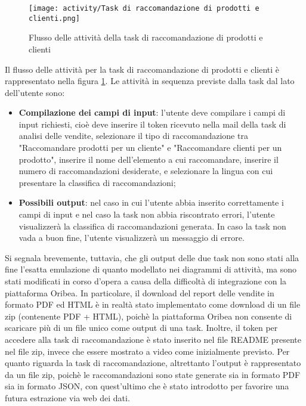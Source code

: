 \begin{figure}[!h]
    \centering 
    \texttt{[image: activity/Task di raccomandazione di prodotti e clienti.png]}
    \caption{Flusso delle attività della task di raccomandazione di prodotti e clienti}
    \label{fig:activity-recommendation-products-customers}
\end{figure}

Il flusso delle attività per la task di raccomandazione di prodotti e clienti è rappresentato nella figura \ref{fig:activity-recommendation-products-customers}. Le attività in sequenza previste dalla task dal lato dell'utente sono:
\begin{itemize}
    \item \textbf{Compilazione dei campi di input}: l'utente deve compilare i campi di input richiesti, cioè deve inserire il token ricevuto nella mail della task di analisi delle vendite, selezionare il tipo di raccomandazione tra "Raccomandare prodotti per un cliente" e "Raccomandare clienti per un prodotto", inserire il nome dell'elemento a cui raccomandare, inserire il numero di raccomandazioni desiderate, e selezionare la lingua con cui presentare la classifica di raccomandazioni;
    \item \textbf{Possibili output}: nel caso in cui l'utente abbia inserito correttamente i campi di input e nel caso la task non abbia riscontrato errori, l'utente visualizzerà la classifica di raccomandazioni generata. In caso la task non vada a buon fine, l'utente visualizzerà un messaggio di errore.
\end{itemize}

Si segnala brevemente, tuttavia, che gli output delle due task non sono stati alla fine l'esatta emulazione di quanto modellato nei diagrammi di attività, ma sono stati modificati in corso d'opera a causa della difficoltà di integrazione con la piattaforma Oribea. In particolare, il download del report delle vendite in formato PDF ed HTML è in realtà stato implementato come download di un file zip (contenente PDF + HTML), poichè la piattaforma Oribea non consente di scaricare più di un file unico come output di una task. Inoltre, il token per accedere alla task di raccomandazione è stato inserito nel file README presente nel file zip, invece che essere mostrato a video come inizialmente previsto. Per quanto riguarda la task di raccomandazione, altrettanto l'output è rappresentato da un file zip, poichè le raccomandazioni sono state generate sia in formato PDF sia in formato JSON, con quest'ultimo che è stato introdotto per favorire una futura estrazione via web dei dati.


